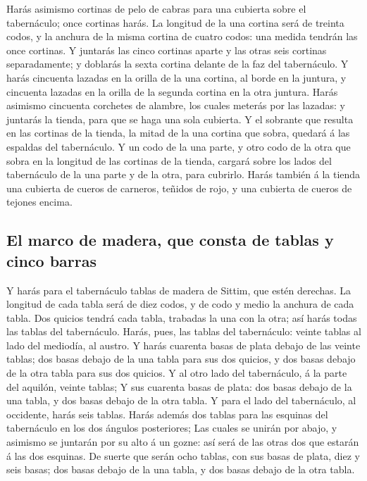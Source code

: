  Harás asimismo cortinas de pelo de cabras para una
cubierta sobre el tabernáculo; once cortinas harás.  La
longitud de la una cortina será de treinta codos, y la anchura de la
misma cortina de cuatro codos: una medida tendrán las once cortinas.
 Y juntarás las cinco cortinas aparte y las otras seis
cortinas separadamente; y doblarás la sexta cortina delante de la faz
del tabernáculo.  Y harás cincuenta lazadas en la orilla
de la una cortina, al borde en la juntura, y cincuenta lazadas en la
orilla de la segunda cortina en la otra juntura.  Harás
asimismo cincuenta corchetes de alambre, los cuales meterás por las
lazadas: y juntarás la tienda, para que se haga una sola cubierta.
 Y el sobrante que resulta en las cortinas de la tienda,
la mitad de la una cortina que sobra, quedará á las espaldas del
tabernáculo.  Y un codo de la una parte, y otro codo de
la otra que sobra en la longitud de las cortinas de la tienda, cargará
sobre los lados del tabernáculo de la una parte y de la otra, para
cubrirlo.  Harás también á la tienda una cubierta de
cueros de carneros, teñidos de rojo, y una cubierta de cueros de tejones
encima.

\hypertarget{el-marco-de-madera-que-consta-de-tablas-y-cinco-barras}{%
\subsection{El marco de madera, que consta de tablas y cinco
barras}\label{el-marco-de-madera-que-consta-de-tablas-y-cinco-barras}}

 Y harás para el tabernáculo tablas de madera de Sittim,
que estén derechas.  La longitud de cada tabla será de
diez codos, y de codo y medio la anchura de cada tabla. 
Dos quicios tendrá cada tabla, trabadas la una con la otra; así harás
todas las tablas del tabernáculo.  Harás, pues, las
tablas del tabernáculo: veinte tablas al lado del mediodía, al austro.
 Y harás cuarenta basas de plata debajo de las veinte
tablas; dos basas debajo de la una tabla para sus dos quicios, y dos
basas debajo de la otra tabla para sus dos quicios.  Y al
otro lado del tabernáculo, á la parte del aquilón, veinte tablas;
 Y sus cuarenta basas de plata: dos basas debajo de la
una tabla, y dos basas debajo de la otra tabla.  Y para
el lado del tabernáculo, al occidente, harás seis tablas.
 Harás además dos tablas para las esquinas del
tabernáculo en los dos ángulos posteriores;  Las cuales
se unirán por abajo, y asimismo se juntarán por su alto á un gozne: así
será de las otras dos que estarán á las dos esquinas.  De
suerte que serán ocho tablas, con sus basas de plata, diez y seis basas;
dos basas debajo de la una tabla, y dos basas debajo de la otra tabla.

